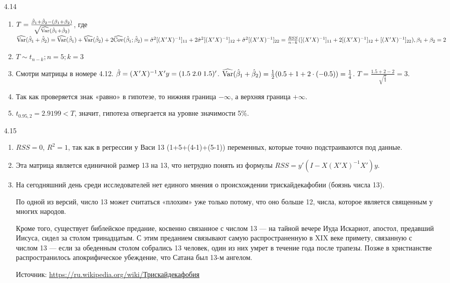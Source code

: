 \protect \hypertarget {soln:4.14}{}
\begin{solution}{{4.14}}
\begin{enumerate}
\item $T = \frac{\hat{\beta}_1 + \hat{\beta}_2 - (\beta_1 + \beta_2)}{\sqrt{\widehat{\operatorname{Var}}(\hat{\beta}_1 + \hat{\beta}_2)}}$, где $\widehat{\operatorname{Var}}(\hat{\beta}_1 + \hat{\beta}_2) = \widehat{\operatorname{Var}}(\hat{\beta}_1) + \widehat{\operatorname{Var}}(\hat{\beta}_2) + 2\widehat{\operatorname{Cov}}(\hat{\beta}_1;\hat{\beta}_2) = \hat{\sigma}^2 [(X'X)^{-1}]_{11} + 2\hat{\sigma}^2 [(X'X)^{-1}]_{12} + \hat{\sigma}^2 [(X'X)^{-1}]_{22}= \frac{RSS}{n - k}([(X'X)^{-1}]_{11} + 2[(X'X)^{-1}]_{12} + [(X'X)^{-1}]_{22}), \beta_1 + \beta_2=2$
\item $T \sim t_{n-k}; n = 5; k = 3$
\item Смотри матрицы в номере 4.12. $\hat{\beta}=(X'X)^{-1}X'y=(1.5\;2.0\;1.5)'$. $\widehat{\operatorname{Var}}(\hat{\beta}_1 + \hat{\beta}_2) =\frac12(0.5+1+2\cdot(-0.5))=\frac14$. $T=\frac{1.5+2-2}{\sqrt{\frac14}}=3$.
\item Так как проверяется знак «равно» в гипотезе, то нижняя граница $-\infty$, а верхняя граница $+\infty$.
\item $t_{0.95,2}=2.9199<T$, значит, гипотеза отвергается на уровне значимости 5\%.
\end{enumerate}
\end{solution}
\protect \hypertarget {soln:4.15}{}
\begin{solution}{{4.15}}
\begin{enumerate}
\item $RSS=0$, $R^2=1$, так как в регрессии у Васи 13 (1+5+(4-1)+(5-1)) переменных, которые точно подстраиваются под данные.
\item Эта матрица является единичной размер 13 на 13, что нетрудно понять из формулы $RSS=y'(I-X(X'X)^{-1}X')y$.
\item На сегодняшний день среди исследователей нет единого мнения о происхождении трискайдекафобии (боязнь числа 13).

По одной из версий, число 13 может считаться «плохим» уже только потому, что оно больше 12, числа, которое является священным у многих народов.

Кроме того, существует библейское предание, косвенно связанное с числом 13 — на тайной вечере Иуда Искариот, апостол, предавший Иисуса, сидел за столом тринадцатым. С этим преданием связывают самую распространенную в XIX веке примету, связанную с числом 13 — если за обеденным столом собрались 13 человек, один из них умрет в течение года после трапезы. Позже в христианстве распространилось апокрифическое убеждение, что Сатана был 13-м ангелом.

Источник: \href{https://ru.wikipedia.org/wiki/%D0%A2%D1%80%D0%B8%D1%81%D0%BA%D0%B0%D0%B9%D0%B4%D0%B5%D0%BA%D0%B0%D1%84%D0%BE%D0%B1%D0%B8%D1%8F}{https://ru.wikipedia.org/wiki/Трискайдекафобия}
\end{enumerate}
\end{solution}
